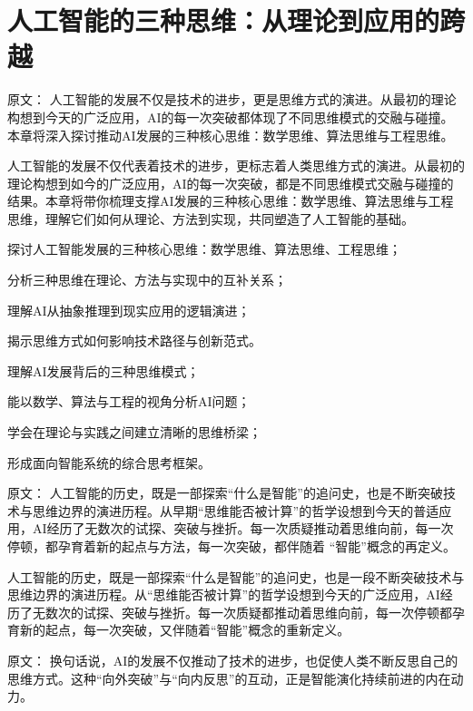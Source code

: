 \chapter{人工智能的三种思维：从理论到应用的跨越}

原文：
人工智能的发展不仅是技术的进步，更是思维方式的演进。从最初的理论构想到今天的广泛应用，AI的每一次突破都体现了不同思维模式的交融与碰撞。本章将深入探讨推动AI发展的三种核心思维：数学思维、算法思维与工程思维。

人工智能的发展不仅代表着技术的进步，更标志着人类思维方式的演进。从最初的理论构想到如今的广泛应用，AI的每一次突破，都是不同思维模式交融与碰撞的结果。本章将带你梳理支撑AI发展的三种核心思维：数学思维、算法思维与工程思维，理解它们如何从理论、方法到实现，共同塑造了人工智能的基础。

\begin{introduction}
  \item 探讨人工智能发展的三种核心思维：数学思维、算法思维、工程思维；
  \item 分析三种思维在理论、方法与实现中的互补关系；
  \item 理解AI从抽象推理到现实应用的逻辑演进；
  \item 揭示思维方式如何影响技术路径与创新范式。
\end{introduction}

\begin{introduction}
  \item 理解AI发展背后的三种思维模式；
  \item 能以数学、算法与工程的视角分析AI问题；
  \item 学会在理论与实践之间建立清晰的思维桥梁；
  \item 形成面向智能系统的综合思考框架。
\end{introduction}

原文：
人工智能的历史，既是一部探索“什么是智能”的追问史，也是不断突破技术与思维边界的演进历程。从早期“思维能否被计算”的哲学设想到今天的普适应用，AI经历了无数次的试探、突破与挫折。每一次质疑推动着思维向前，每一次停顿，都孕育着新的起点与方法，每一次突破，都伴随着 “智能”概念的再定义。

人工智能的历史，既是一部探索“什么是智能”的追问史，也是一段不断突破技术与思维边界的演进历程。从“思维能否被计算”的哲学设想到今天的广泛应用，AI经历了无数次的试探、突破与挫折。每一次质疑都推动着思维向前，每一次停顿都孕育新的起点，每一次突破，又伴随着“智能”概念的重新定义。

原文：
换句话说，AI的发展不仅推动了技术的进步，也促使人类不断反思自己的思维方式。这种“向外突破”与“向内反思”的互动，正是智能演化持续前进的内在动力。

